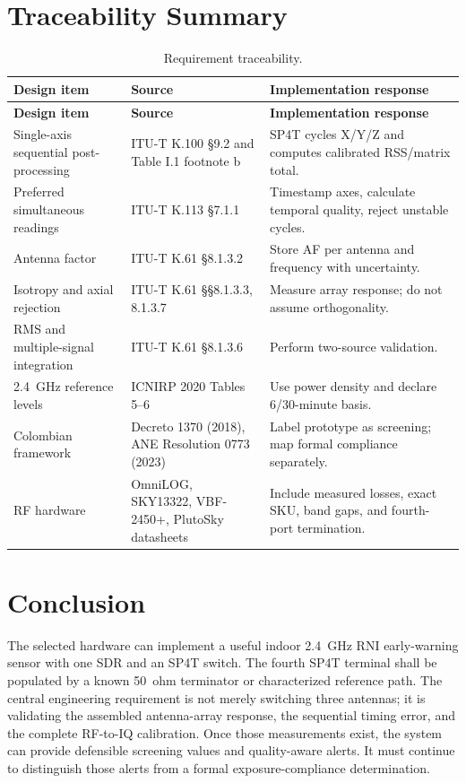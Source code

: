 \documentclass[11pt,a4paper]{article}
\begin{document}
\section{Traceability Summary}
\begin{longtable}{L{0.25\textwidth}L{0.30\textwidth}L{0.34\textwidth}}
\caption{Requirement traceability.}\\
\toprule
\textbf{Design item} & \textbf{Source} & \textbf{Implementation response}\\
\midrule
\endfirsthead
\toprule
\textbf{Design item} & \textbf{Source} & \textbf{Implementation response}\\
\midrule
\endhead
Single-axis sequential post-processing & ITU-T K.100 §9.2 and Table I.1 footnote b & SP4T cycles X/Y/Z and computes calibrated RSS/matrix total.\\
Preferred simultaneous readings & ITU-T K.113 §7.1.1 & Timestamp axes, calculate temporal quality, reject unstable cycles.\\
Antenna factor & ITU-T K.61 §8.1.3.2 & Store AF per antenna and frequency with uncertainty.\\
Isotropy and axial rejection & ITU-T K.61 §§8.1.3.3, 8.1.3.7 & Measure array response; do not assume orthogonality.\\
RMS and multiple-signal integration & ITU-T K.61 §8.1.3.6 & Perform two-source validation.\\
2.4~GHz reference levels & ICNIRP 2020 Tables 5--6 & Use power density and declare 6/30-minute basis.\\
Colombian framework & Decreto 1370 (2018), ANE Resolution 0773 (2023) & Label prototype as screening; map formal compliance separately.\\
RF hardware & OmniLOG, SKY13322, VBF-2450+, PlutoSky datasheets & Include measured losses, exact SKU, band gaps, and fourth-port termination.\\
\bottomrule
\end{longtable}

\section{Conclusion}
The selected hardware can implement a useful indoor 2.4~GHz RNI early-warning sensor with one SDR and an SP4T switch. The fourth SP4T terminal shall be populated by a known 50~ohm terminator or characterized reference path. The central engineering requirement is not merely switching three antennas; it is validating the assembled antenna-array response, the sequential timing error, and the complete RF-to-IQ calibration. Once those measurements exist, the system can provide defensible screening values and quality-aware alerts. It must continue to distinguish those alerts from a formal exposure-compliance determination.

\newpage
\nocite{IEEE-149,ISO-IEC-17025}

\end{document}
